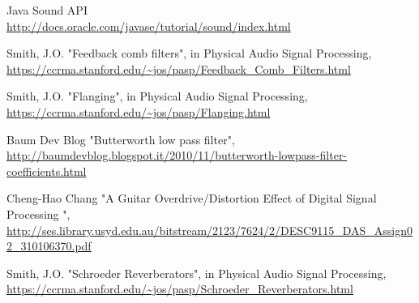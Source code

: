 \cleardoublepage
\pagebreak
{}
{}
\begin{thebibliography}{99}

Java Sound API\\
    {\small \url{http://docs.oracle.com/javase/tutorial/sound/index.html}}
    
Smith, J.O. "Feedback comb filters", in Physical Audio Signal
    Processing,\\
    {\small \url{https://ccrma.stanford.edu/~jos/pasp/Feedback_Comb_Filters.html}}

Smith, J.O. "Flanging", in Physical Audio Signal
    Processing,\\
    {\small \url{https://ccrma.stanford.edu/~jos/pasp/Flanging.html}}
    
Baum Dev Blog "Butterworth low pass filter",\\
	{\small \url{http://baumdevblog.blogspot.it/2010/11/butterworth-lowpass-filter-coefficients.html}}

Cheng-Hao Chang "A Guitar Overdrive/Distortion Effect
    of Digital Signal Processing ",\\
	{\small \url{http://ses.library.usyd.edu.au/bitstream/2123/7624/2/DESC9115_DAS_Assign02_310106370.pdf}}

Smith, J.O. "Schroeder Reverberators", in Physical Audio
    Signal Processing,\\
	{\small \url{https://ccrma.stanford.edu/~jos/pasp/Schroeder_Reverberators.html}}
    

\end{thebibliography}
